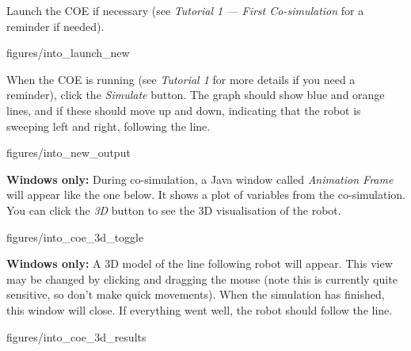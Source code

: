 \documentclass[11pt,a4paper]{../tutorial}
\begin{document}
\begin{instructions}

\item Launch the COE if necessary (see \emph{Tutorial 1 --- First Co-simulation} for a reminder if needed).


    \begin{annotation}[width=0.85\linewidth,trim=0 110 0 200,clip]{figures/into_launch_new}
    \end{annotation}

\item When the COE is running (see \emph{Tutorial 1} for more details if you need a reminder), click the \emph{Simulate} button. The graph should show blue and orange lines, and if these should move up and down, indicating that the robot is sweeping left and right, following the line.

    \begin{annotation}[width=0.85\linewidth,trim=0 30 0 35,clip]{figures/into_new_output}
    \end{annotation}

\newpage
\item \textbf{Windows only:} During co-simulation, a Java window called \emph{Animation Frame} will appear like the one below. It shows a plot of variables from the co-simulation. You can click the \emph{3D} button to see the 3D visualisation of the robot.

    \begin{annotation}[width=0.5\linewidth,trim=0 0 0 0,clip]{figures/into_coe_3d_toggle}
    \end{annotation}

\item \textbf{Windows only:} A 3D model of the line following robot will appear. This view may be changed by clicking and dragging the mouse (note this is currently quite sensitive, so don’t make quick movements). When the simulation has finished, this window will close. If everything went well, the robot should follow the line.

    \begin{annotation}[width=0.5\linewidth,trim=0 300 0 0,clip]{figures/into_coe_3d_results}
    \end{annotation}

\end{instructions}
\end{document}

